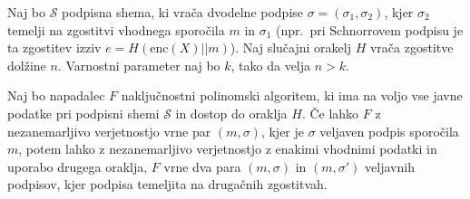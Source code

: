 \begin{izrek}
\label{izr:forking}
    Naj bo $\mathcal{S}$ podpisna shema, ki vrača dvodelne podpise $\sigma = (\sigma_1, \sigma_2)$,
    kjer $\sigma_2$ temelji na zgostitvi vhodnega sporočila $m$ in $\sigma_1$ (npr.\ pri Schnorrovem
    podpisu je ta zgostitev izziv  $e = H(\text{enc}(X) || m)$). Naj slučajni orakelj $H$ vrača zgostitve
    dolžine $n$. Varnostni parameter naj bo $k$, tako da velja $n > k$.

    Naj bo napadalec $F$ naključnostni polinomski algoritem, ki ima na voljo vse javne podatke pri
    podpisni shemi $\mathcal{S}$ in dostop do oraklja $H$. Če lahko $F$ z nezanemarljivo verjetnostjo
    vrne par $(m, \sigma)$, kjer je $\sigma$  veljaven podpis sporočila $m$, potem lahko z nezanemarljivo
    verjetnostjo z enakimi vhodnimi podatki in uporabo drugega oraklja, $F$ vrne dva para
    $(m, \sigma)$ in $(m, \sigma')$ veljavnih podpisov, kjer podpisa temeljita na drugačnih zgostitvah.
\end{izrek}

